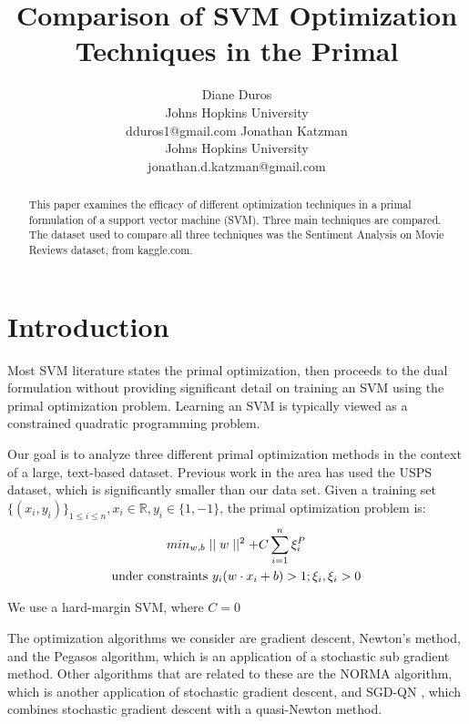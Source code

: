 \documentclass[letterpaper, 11pt]{article}
\title{Comparison of SVM Optimization Techniques in the Primal}
\author{Diane Duros \\
	Johns Hopkins University\\
	dduros1@gmail.com
\And Jonathan Katzman\\
	Johns Hopkins University\\
	jonathan.d.katzman@gmail.com}
\begin{document}
\maketitle

\begin{abstract}
This paper examines the efficacy of different optimization techniques in a primal formulation of a support vector machine (SVM).  Three main techniques are compared.  The dataset used to compare all three techniques was the Sentiment Analysis on Movie Reviews dataset, from kaggle.com.
\end{abstract}
                                                                                                                                                                                                                                                                           
\section{Introduction}
Most SVM literature states the primal optimization, then proceeds to the dual formulation without providing significant detail on training an SVM using the primal optimization problem.  Learning an SVM is typically viewed as a constrained quadratic programming problem.

Our goal is to analyze three different primal optimization methods in the context of a large, text-based dataset.  Previous work in the area\cite{chapelle2007training} has used the USPS dataset, which is significantly smaller than our data set.  Given a training set $\{ (x_i, y_i) \}_{1\le i\le n}, x_i \in \mathbb{R}, y_i \in \{1, -1\} $, the primal optimization problem is:
\begin{gather} min_{w,b} \mid \mid w \mid \mid ^2 + C\sum_{i=1}^n \xi_i^P\notag\\ 
\text{under constraints } y_i(w\cdot x_i + b) > 1; \xi_i, \xi_i > 0\label{primalobj}\end{gather}

We use a hard-margin SVM, where $C=0$

The optimization algorithms we consider are gradient descent, Newton's method, and the Pegasos algorithm, which is an application of a stochastic sub gradient method.  Other algorithms that are related to these are the NORMA algorithm\cite{norma}, which is another application of stochastic gradient descent, and SGD-QN \cite{sgdqn}, which combines stochastic gradient descent with a quasi-Newton method.
\end{document}
